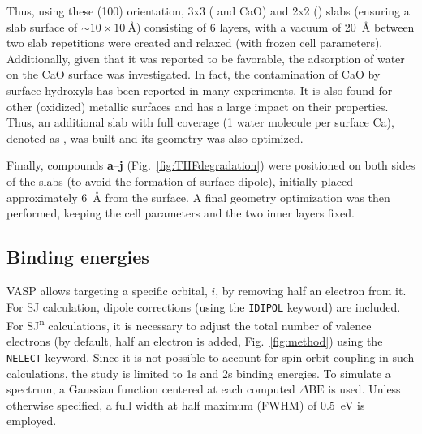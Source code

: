 \documentclass[journal=jpccck,manuscript=article]{achemso}
\def\dbe{\ensuremath{\Delta\text{BE}}}
\begin{document}
Thus, using these (100) orientation, 3x3 ( and CaO) and 2x2 () slabs (ensuring a slab surface of $\sim 10\times \SI{10}{\angstrom}$) consisting of 6 layers, with a vacuum of \SI{20}{\angstrom} between two slab repetitions were created and relaxed (with frozen cell parameters). 
Additionally, given that it was reported to be favorable\cite{deleeuwDensityFunctionalTheory2000,fujimoriInteractionWaterCaO2016a}, the adsorption of water on the CaO surface was investigated. In fact, the contamination of CaO by surface hydroxyls has been reported in many experiments\cite{dupinSystematicXPSStudies2000,bebenseeAdsorptionOxygenWater2008,fujimoriInteractionWaterCaO2016a,cristXPSLibraryWebsite2021a}. It is also found for other (oxidized) metallic surfaces\cite{tielensDFTStudyWater2006,truflandierDFTNMRInvestigation51V2010,tougertiStructureCleanHydrated2011}  and has a large impact on their properties. Thus, an additional slab with full coverage (1 water molecule per surface Ca), denoted as , was built and its geometry was also optimized. 

Finally, compounds \textbf{a}--\textbf{j} (Fig.~\ref{fig:THFdegradation}) were positioned on both sides of the slabs (to avoid the formation of surface dipole), initially placed approximately \SI{6}{\angstrom} from the surface. A final geometry optimization was then performed, keeping the cell parameters and the two inner layers fixed.

\subsection{Binding energies} 

VASP allows targeting a specific orbital, $i$, by removing half an electron from it. For SJ calculation, dipole corrections (using the \texttt{IDIPOL} keyword) are included. For SJ\textsuperscript{n} calculations, it is necessary to adjust the total number of valence electrons (by default, half an electron is added, Fig.~\ref{fig:method}) using the \texttt{NELECT} keyword. Since it is not possible to account for spin-orbit coupling in such calculations, the study is limited to 1s and 2s binding energies. To simulate a spectrum, a Gaussian function centered at each computed \dbe{} is used. Unless otherwise specified, a full width at half maximum (FWHM) of \SI{0.5}{\electronvolt} is employed.
\end{document}
